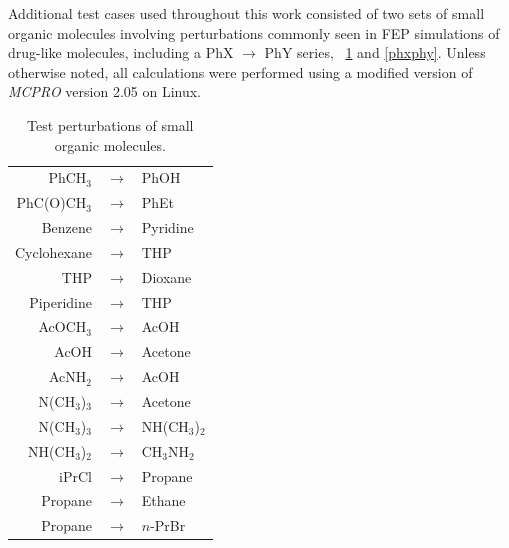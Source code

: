 \documentclass[12pt]{report}
\newcommand*\tbls[1]{\tabslab~\ref{#1}}
\begin{document}
Additional test cases used throughout this work consisted of two sets of small organic molecules involving perturbations commonly seen in FEP simulations of drug-like molecules, including a PhX $\longrightarrow$ PhY series, \tbls{small} and \ref{phxphy}. Unless otherwise noted, all calculations were performed using a modified version of \textit{MCPRO} \cite{jorgmcp} version 2.05 on Linux.

\begin{table}[p]
\centering
\caption{Test perturbations of small organic molecules.}
\begin{tabular}{rcl}
\toprule
PhCH$_3$  & $\longrightarrow$ &  PhOH \\
PhC(O)CH$_3$  & $\longrightarrow$ &  PhEt \\
Benzene  & $\longrightarrow$ &  Pyridine   \\
Cyclohexane  & $\longrightarrow$ &  THP \\
THP & $\longrightarrow$ & Dioxane   \\
Piperidine & $\longrightarrow$ &  THP    \\
AcOCH$_3$ & $\longrightarrow$ & AcOH    \\
AcOH & $\longrightarrow$ & Acetone   \\
AcNH$_2$ & $\longrightarrow$ & AcOH   \\
N(CH$_3$)$_3$ & $\longrightarrow$ & Acetone   \\ 
N(CH$_3$)$_3$ & $\longrightarrow$ & NH(CH$_3$)$_2$   \\ 
NH(CH$_3$)$_2$ & $\longrightarrow$ & CH$_3$NH$_2$   \\
iPrCl & $\longrightarrow$ & Propane   \\
Propane & $\longrightarrow$ & Ethane   \\
Propane & $\longrightarrow$ & $n$-PrBr   \\
\bottomrule
\end{tabular}
\label{small}
\end{table}
\end{document}
